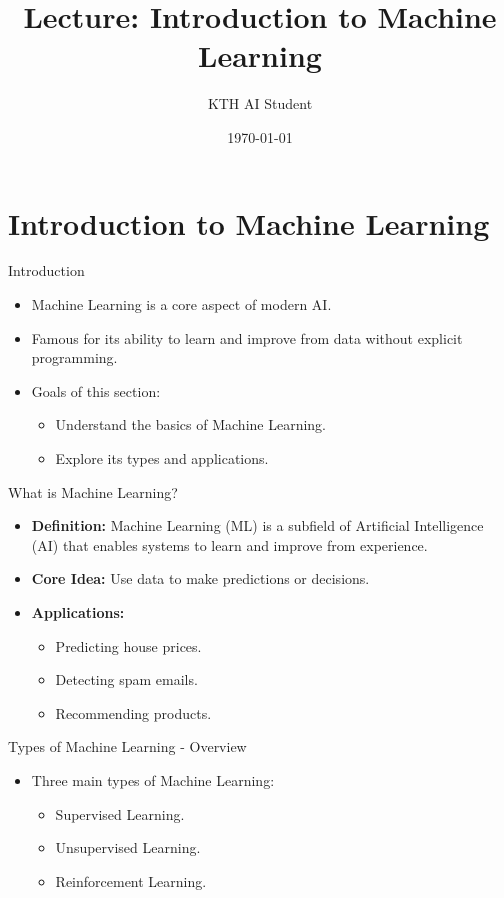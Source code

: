 \documentclass{beamer}
\title{Lecture: Introduction to Machine Learning}
\author{KTH AI Student}
\date{\today}
\begin{document}
\frame{\titlepage}

\section{Introduction to Machine Learning}

\begin{frame}{Introduction}
\begin{itemize}
    \item Machine Learning is a core aspect of modern AI.
    \item Famous for its ability to learn and improve from data without explicit programming.
    \item Goals of this section:
    \begin{itemize}
        \item Understand the basics of Machine Learning.
        \item Explore its types and applications.
    \end{itemize}
\end{itemize}
\end{frame}

\begin{frame}{What is Machine Learning?}
\begin{itemize}
    \item \textbf{Definition:} Machine Learning (ML) is a subfield of Artificial Intelligence (AI) that enables systems to learn and improve from experience.
    \item \textbf{Core Idea:} Use data to make predictions or decisions.
    \item \textbf{Applications:}
    \begin{itemize}
        \item Predicting house prices.
        \item Detecting spam emails.
        \item Recommending products.
    \end{itemize}
\end{itemize}
\end{frame}

\begin{frame}{Types of Machine Learning - Overview}
\begin{itemize}
    \item Three main types of Machine Learning:
    \begin{itemize}
        \item Supervised Learning.
        \item Unsupervised Learning.
        \item Reinforcement Learning.
    \end{itemize}
\end{itemize}
\end{frame}
\end{document}
